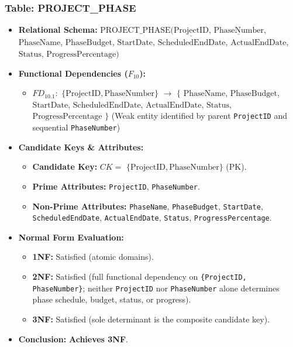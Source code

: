 \documentclass[a4paper,12pt]{report}
\providecommand{\tightlist}{%
  \setlength{\itemsep}{0pt}\setlength{\parskip}{0pt}}
\begin{document}
\subsubsection{\texorpdfstring{Table: PROJECT\_\allowbreak{}PHASE}{Table: PROJECTPHASE}}\label{table-project_phase}

\begin{itemize}
\item
  \textbf{Relational Schema:} \(\text{PROJECT\_PHASE}(\underline{\text{ProjectID}}\), \(\underline{\text{PhaseNumber}}\), \(\text{PhaseName}\), \(\text{PhaseBudget}\), \(\text{StartDate}\), \(\text{ScheduledEndDate}\), \(\text{ActualEndDate}\), \(\text{Status}\), \(\text{ProgressPercentage})\)
\item
  \textbf{Functional Dependencies (\(F_{10}\)):}

  \begin{itemize}
  \tightlist
  \item
    \(FD_{10.1}:\) \(\{\text{ProjectID}, \text{PhaseNumber}\}\) \(\rightarrow\) \(\{\) \(\text{PhaseName}\), \(\text{PhaseBudget}\), \(\text{StartDate}\), \(\text{ScheduledEndDate}\), \(\text{ActualEndDate}\), \(\text{Status}\), \(\text{ProgressPercentage}\) \(\}\) (Weak entity identified by parent \texttt{ProjectID} and sequential \texttt{PhaseNumber})
  \end{itemize}
\item
  \textbf{Candidate Keys \& Attributes:}

  \begin{itemize}
  \item
    \textbf{Candidate Key:} \(CK =\) \(\{\text{ProjectID}, \text{PhaseNumber}\}\) (PK).
  \item
    \textbf{Prime Attributes:} \texttt{ProjectID}, \texttt{PhaseNumber}.
  \item
    \textbf{Non-Prime Attributes:} \texttt{PhaseName}, \texttt{PhaseBudget}, \texttt{StartDate}, \texttt{ScheduledEndDate}, \texttt{ActualEndDate}, \texttt{Status}, \texttt{ProgressPercentage}.
  \end{itemize}
\item
  \textbf{Normal Form Evaluation:}

  \begin{itemize}
  \item
    \textbf{1NF:} Satisfied (atomic domains).
  \item
    \textbf{2NF:} Satisfied (full functional dependency on \texttt{\{ProjectID, PhaseNumber\}}; neither \texttt{ProjectID} nor \texttt{PhaseNumber} alone determines phase schedule, budget, status, or progress).
  \item
    \textbf{3NF:} Satisfied (sole determinant is the composite candidate key).
  \end{itemize}
\item
  \textbf{Conclusion:} \textbf{Achieves 3NF}.
\end{itemize}
\end{document}
